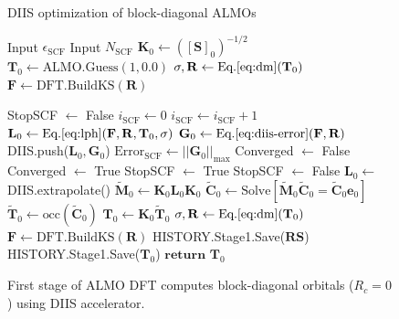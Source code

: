\documentclass[aip,jcp,reprint,amsmath,amssymb]{revtex4-1}
\begin{document}
\begin{figure}
\begin{algorithm}[H]
  \caption{DIIS optimization of block-diagonal ALMOs}
  \label{alg:almo0}
   \begin{algorithmic}[1]
	\State Input $\epsilon_{\text{SCF}}$ 
	\State Input $N_{\text{SCF}}$ 
	\State $\mathbf{K}_0 \gets ([\mathbf{S}]_0)^{-1/2}$ 
	\State $\mathbf{T}_0 \gets \text{ALMO.Guess}(1, 0.0)$ 
	\State $\mathbf{\sigma,R} \gets \text{Eq.\ref{eq:dm}}(\mathbf{T}_0)$ 
	\State $\mathbf{F} \gets \text{DFT.BuildKS}(\mathbf{R})$ 

	\State StopSCF $\gets$ False 
	\State $i_{\text{SCF}} \gets 0$ 
	\Repeat {}
		\State $i_{\text{SCF}} \gets i_{\text{SCF}} + 1$ 
		\State $\mathbf{L}_{0} \gets \text{Eq.}\ref{eq:lph}(\mathbf{F},\mathbf{R},\mathbf{T}_0,\mathbf{\sigma})$ 
		\State $\mathbf{G}_0 \gets \text{Eq.\ref{eq:diis-error}}(\mathbf{F},\mathbf{R})$ 
		\State DIIS.push($\mathbf{L}_{0}, \mathbf{G}_{0}$)
		\State $\text{Error}_\text{SCF} \gets \vert\vert \mathbf{G}_0 \vert \vert_{\text{max}}$
			\State Converged $\gets$ False
		\Else
			\State Converged $\gets$ True
		\EndIf
			\State StopSCF $\gets$ True
		\EndIf
			\State StopSCF $\gets$ False 
		\EndIf
			\State $\mathbf{L}_{0}\gets$DIIS.extrapolate()
			\State $\mathbf{\tilde{M}}_{0} \gets \mathbf{K}_0 \mathbf{L}_{0} \mathbf{K}_0$ 
			\State $\mathbf{\tilde{C}}_0 \gets \text{Solve}[\mathbf{\tilde{M}}_{0} \mathbf{\tilde{C}}_{0} = \mathbf{\tilde{C}}_{0} \mathbf{e}_{0}] $ 
			\State $\mathbf{\tilde{T}}_{0} \gets \text{occ}(\mathbf{\tilde{C}}_{0})$ 
			\State $\mathbf{T}_{0} \gets \mathbf{K}_0 \mathbf{\tilde{T}}_{0}$ 
			\State $\mathbf{\sigma,R} \gets \text{Eq.\ref{eq:dm}}(\mathbf{T}_0)$ 
			\State $\mathbf{F} \gets \text{DFT.BuildKS}(\mathbf{R})$ 
		\EndIf
	\State HISTORY.Stage1.Save($\mathbf{RS}$) 
	\State HISTORY.Stage1.Save($\mathbf{T}_0$) 
	\State $\mathbf{return}$ $\mathbf{T}_0$
	\EndProcedure
   \end{algorithmic}
\end{algorithm}
\caption{\label{fig:almo0} First stage of ALMO DFT computes block-diagonal orbitals ($R_c=0$) using DIIS accelerator.}
\end{figure}
\end{document}

